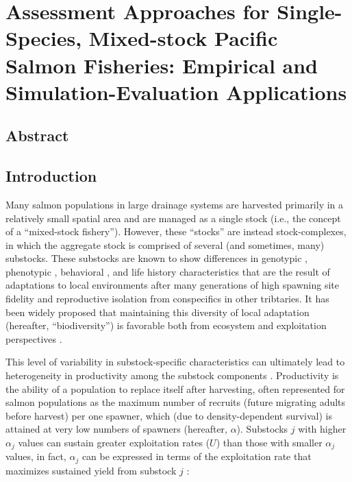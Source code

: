\documentclass[12pt,]{book}
\theoremstyle{definition}
\theoremstyle{definition}
\theoremstyle{definition}
\theoremstyle{remark}
\begin{document}
\setlength{\parskip}{0pt plus 0pt minus 0pt}

\doublespacing

\chapter{Assessment Approaches for Single-Species, Mixed-stock Pacific
Salmon Fisheries: Empirical and Simulation-Evaluation
Applications}\label{ch4}

\section*{Abstract}\label{abstract}

\newpage

\section{Introduction}\label{introduction}

\noindent
Many salmon populations in large drainage systems are harvested
primarily in a relatively small spatial area and are managed as a single
stock (i.e., the concept of a ``mixed-stock fishery''). However, these
``stocks'' are instead stock-complexes, in which the aggregate stock is
comprised of several (and sometimes, many) substocks. These substocks
are known to show differences in genotypic \citep{templin-etal-2004},
phenotypic \citep[e.g., morphology;][]{hendry-quinn-1997}, behavioral
\citep[e.g., run timing;][]{clark-etal-2015, smith-liller-2017}, and
life history \citep[i.e., age-at-maturation,][]{blair-etal-1993}
characteristics that are the result of adaptations to local environments
after many generations of high spawning site fidelity and reproductive
isolation from conspecifics in other tribtaries. It has been widely
proposed that maintaining this diversity of local adaptation (hereafter,
``biodiversity'') is favorable both from ecosystem and exploitation
perspectives \citep[i.e., the statistical dampening of random
variability in a system made up of many additive random processes,
otherwise known as the ``portfolio
effect'';][]{schindler-etal-2010, schindler-etal-2015}.

This level of variability in substock-specific characteristics can
ultimately lead to heterogeneity in productivity among the substock
components \citep{walters-martell-2004}. Productivity is the ability of
a population to replace itself after harvesting, often represented for
salmon populations as the maximum number of recruits (future migrating
adults before harvest) per one spawner, which (due to density-dependent
survival) is attained at very low numbers of spawners (hereafter,
\(\alpha\)). Substocks \(j\) with higher \(\alpha_j\) values can sustain
greater exploitation rates (\(U\)) than those with smaller \(\alpha_j\)
values, in fact, \(\alpha_j\) can be expressed in terms of the
exploitation rate that maximizes sustained yield from substock \(j\)
\citep{schnute-kronlund-2002}:
\end{document}
